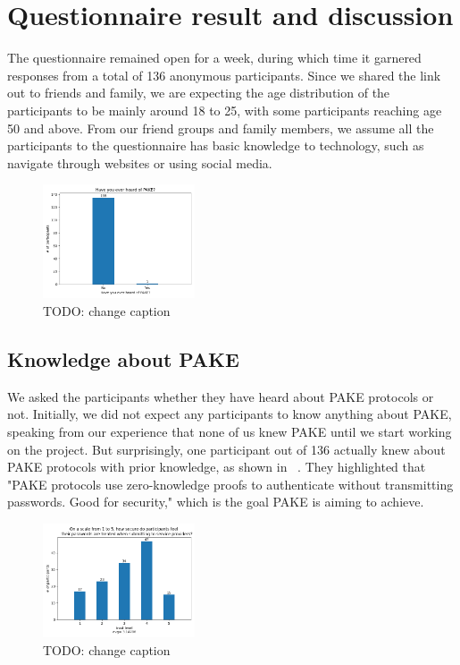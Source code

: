 \section{Questionnaire result and discussion}




The questionnaire remained open for a week, during which time it garnered responses from a total of 136 anonymous participants.
Since we shared the link out to friends and family, we are expecting the age distribution of the participants to be mainly around 18 to 25, with some participants reaching age 50 and above.
From our friend groups and family members, we assume all the participants to the questionnaire has basic knowledge to technology, such as navigate through websites or using social media.

\begin{figure}[ht]
  \centering
  \includegraphics[width=0.4\textwidth]{./images/know_pake.png}
  \caption{TODO: change caption}
  \label{fig:know_pake}
\end{figure}

\subsection{Knowledge about PAKE}
We asked the participants whether they have heard about PAKE protocols or not.
Initially, we did not expect any participants to know anything about PAKE, speaking from our experience that none of us knew PAKE until we start working on the project.
But surprisingly, one participant out of 136 actually knew about PAKE protocols with prior knowledge, as shown in ~.
They highlighted that "PAKE protocols use zero-knowledge proofs to authenticate without transmitting passwords. Good for security," which is the goal PAKE is aiming to achieve.





\begin{figure}[ht]
  \centering
  \includegraphics[width=0.4\textwidth]{./images/service_provider_trust.png}
  \caption{TODO: change caption}
  \label{fig:trust}
\end{figure}


